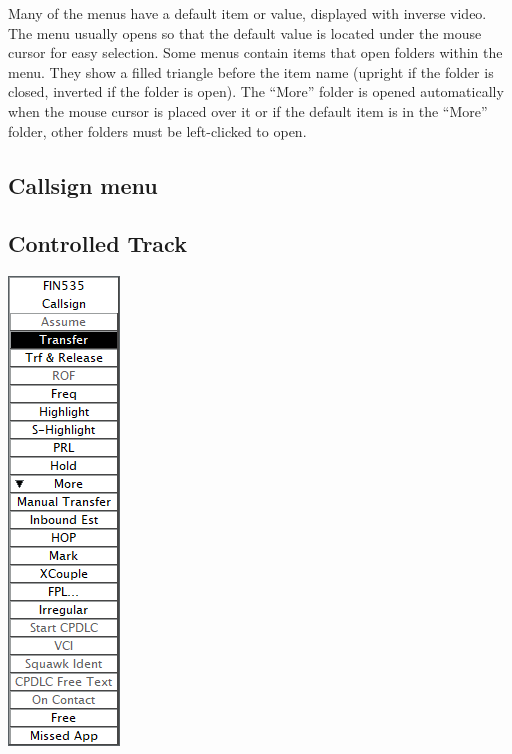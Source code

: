 \documentclass[11pt,a4paper,oldfontcommands]{memoir}
\begin{document}
Many of the menus have a default item or value, displayed with inverse video. The menu usually opens so
that the default value is located under the mouse cursor for easy selection. Some menus contain items that
open folders within the menu. They show a filled triangle before the item name (upright if the folder is
closed, inverted if the folder is open). The “More” folder is opened automatically when the mouse cursor is
placed over it or if the default item is in the “More” folder, other folders must be left-clicked to open.\\

\subsection{Callsign menu}
\label{menu:cs}
\subsection*{Controlled Track}
\includegraphics{img/cm.png}
\end{document}
